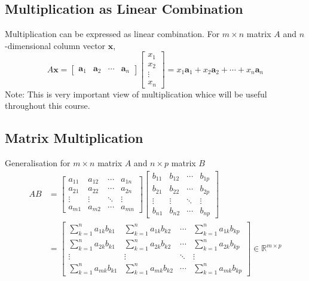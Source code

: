 \subsection{Multiplication as Linear Combination}
Multiplication can be expressed as linear combination. For $m\times n$ matrix $A$ and $n$-dimensional column vector $\mathbf{x}$,
$$A\mathbf{x}=\begin{bmatrix}
    \mathbf{a}_1 & \mathbf{a}_2 & \cdots & \mathbf{a}_n
\end{bmatrix} \begin{bmatrix}
    x_1\\x_2\\\vdots\\x_n
\end{bmatrix}=x_1\mathbf{a}_1+x_2\mathbf{a}_2+\cdots+x_n\mathbf{a}_n$$
Note: This is very important view of multiplication whice will be useful throughout this course.

\subsection{Matrix Multiplication}
Generalisation for $m\times n$ matrix $A$ and $n\times p$ matrix $B$
\begin{align*}
    AB&=\begin{bmatrix}
        a_{11}&a_{12}&\cdots&a_{1n}\\
        a_{21}&a_{22}&\cdots&a_{2n}\\
        \vdots&\vdots&\ddots&\vdots\\
        a_{m1}&a_{m2}&\cdots&a_{mn}
    \end{bmatrix}\begin{bmatrix}
        b_{11}&b_{12}&\cdots&b_{1p}\\
        b_{21}&b_{22}&\cdots&b_{2p}\\
        \vdots&\vdots&\ddots&\vdots\\
        b_{n1}&b_{n2}&\cdots&b_{np}
    \end{bmatrix}\\
    &=\begin{bmatrix}
        \sum^n_{k=1}a_{1k}b_{k1}&\sum^n_{k=1}a_{1k}b_{k2}&\cdots&\sum^n_{k=1}a_{1k}b_{kp}\\
        \sum^n_{k=1}a_{2k}b_{k1}&\sum^n_{k=1}a_{2k}b_{k2}&\cdots&\sum^n_{k=1}a_{2k}b_{kp}\\
        \vdots&\vdots&\ddots&\vdots\\
        \sum^n_{k=1}a_{mk}b_{k1}&\sum^n_{k=1}a_{mk}b_{k2}&\cdots&\sum^n_{k=1}a_{mk}b_{kp}
    \end{bmatrix} \in \mathbb{R}^{m\times p}
\end{align*}

